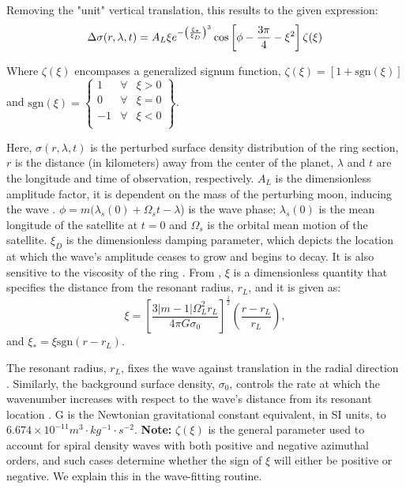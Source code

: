 \documentclass{article}
\begin{document}
Removing the "unit" vertical translation, this results to the given expression: 
\begin{equation}
   \Delta \sigma(r,\lambda,t) = A_{L}\xi\\e^{-\left(\frac{\xi_{*}}{\xi_{D}}\right)^3}\cos\left[\phi-\frac{3\pi}{4}-\xi^2\right]\zeta(\xi)
\end{equation}

Where $\zeta(\xi)$ encompases a generalized signum function, $\zeta(\xi) = [1 + \mathrm{sgn}(\xi)]$  and $ \mathrm{sgn}(\xi) = \left\{ \begin{array}{rcl}
1 & \forall
& \xi>0 \\ 0 & \forall & \xi=0 \\ -1 & \forall & \xi<0 \\
\end{array}\right\}$.

\vspace{3}

Here, $\sigma(r,\lambda,t)$ is the perturbed surface density distribution of the ring section, $r$ is the distance (in kilometers) away from the center of the planet, $\lambda$ and $t$ are the longitude and time of observation, respectively. $A_{L}$ is the dimensionless amplitude factor, it is dependent on the mass of the perturbing moon, inducing the wave \cite{Tiscareno_2007}. $\phi = m(\lambda_{s}(0)+\Omega_{s}t-\lambda$) is the wave phase; $\lambda_{s}(0)$ is the mean longitude of the satellite at $t=0$ and $\Omega_{s}$ is the orbital mean motion of the satellite. $\xi_{D}$ is the dimensionless damping parameter, which depicts the location at which the wave's amplitude ceases to grow and begins to decay. It is also sensitive to the viscosity of the ring \cite{Tiscareno_2007}.
From \cite{Nicholson1990AnAR} \cite{1984prin.conf..513S}, $\xi$ is a dimensionless quantity that specifies the distance from the resonant radius, $r_{L}$, and it is given as:
\begin{equation}
\xi = \left[\frac{3|m-1|\Omega_{L}^{2}r_{L}}{4\pi G \sigma_{0}}\right]^{\frac{1}{2}}\left(\frac{r-r_{L}}{r_{L}}\right), 
\end{equation}
and $\xi_{*} = \xi \mathrm{sgn}(r - r_{L})$.

\vspace{3}

The resonant radius, $r_{L}$, fixes the wave against translation in the radial direction \cite{Tiscareno_2007}. Similarly, the background surface density, $\sigma_{0}$, controls the rate at which the wavenumber increases with respect to the wave's distance from its resonant location \cite{Tiscareno_2007}. G is the Newtonian gravitational constant equivalent, in SI units, to $6.674 \times 10^{-11} m^{3}⋅kg^{-1}⋅s^{-2}$.
\textbf{Note:} $\zeta(\xi)$ is the general parameter used to account for spiral density waves with both positive and negative azimuthal orders, and such cases determine whether the sign of $\xi$ will either be positive or negative. We explain this in the wave-fitting routine.
\end{document}
